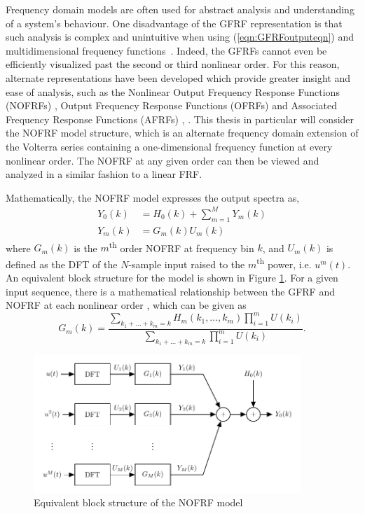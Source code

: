 Frequency domain models are often used for abstract analysis and understanding of a system's behaviour. One disadvantage of the GFRF representation is that such analysis is complex and unintuitive when using (\ref{eqn:GFRFoutputeqn}) and multidimensional frequency functions~\cite{Billings1989}. Indeed, the GFRFs cannot even be efficiently visualized past the second or third nonlinear order. For this reason, alternate representations have been developed which provide greater insight and ease of analysis, such as the Nonlinear Output Frequency Response Functions (NOFRFs) \cite{Lang2005}, Output Frequency Response Functions (OFRFs) \cite{Lang2007} and Associated Frequency Response Functions (AFRFs) \cite{Feijoo2005}, \cite{Feijoo2006}. This thesis in particular will consider the NOFRF model structure, which is an alternate frequency domain extension of the Volterra series containing a one-dimensional frequency function at every nonlinear order. The NOFRF at any given order can then be viewed and analyzed in a similar fashion to a linear FRF. 

Mathematically, the NOFRF model expresses the output spectra as,
\begin{align}
Y_0(k) &= H_0(k) + \sum_{m=1}^{M} Y_m(k) \\
Y_m(k) &= G_m(k) U_m(k)  \label{eq:NOFRF_TransientFree}
\end{align}
where $G_m(k)$ is the $m$\textsuperscript{th} order NOFRF at frequency bin $k$, and $U_m(k)$ is defined as the DFT of the $N$-sample input raised to the $m$\textsuperscript{th} power, i.e. $u^m(t)$. An equivalent block structure for the model is shown in Figure \ref{fig:NOFRF_ModelStructure}. For a given input sequence, there is a mathematical relationship between the GFRF and NOFRF at each nonlinear order \cite{Cheng2017}, which can be given as
\begin{equation}
G_m(k) = \frac{\sum\limits_{k_1+\hdots+k_m = k} H_m(k_1, \hdots, k_m) \prod\limits_{i=1}^m U(k_i)}{\sum\limits_{k_1+\hdots+k_m = k} \prod\limits_{i=1}^m U(k_i)}.
\label{eq:GFRF2NOFRF}
\end{equation}

\begin{figure}[h]
\centering
\includegraphics[width=0.9\textwidth]{Chapter3_VolterraSeries/NOFRF_blockstructure.pdf}
\caption{Equivalent block structure of the NOFRF model}
\label{fig:NOFRF_ModelStructure}
\end{figure}


